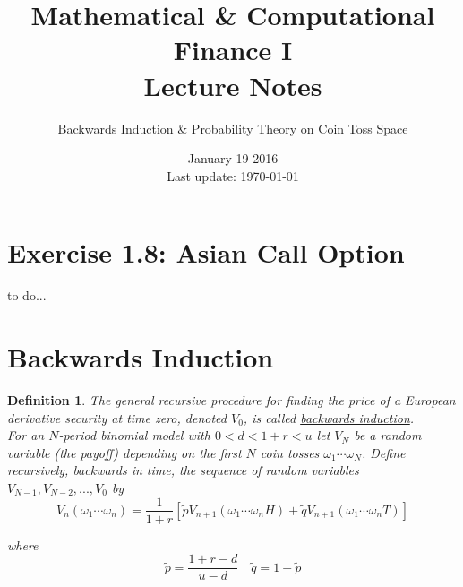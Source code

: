 \documentclass[12pt]{article}
\newtheorem{definition}{Definition}
\newlength\tindent
\renewcommand{\indent}{\hspace*{\tindent}}
\begin{document}
 
 
\title{Mathematical \& Computational Finance I\\Lecture Notes}
\author{Backwards Induction \& Probability Theory on Coin Toss Space}
\date{January 19 2016 \\ Last update: \today{}}
\maketitle

\section{Exercise 1.8: Asian Call Option}

to do...

\section{Backwards Induction}

\begin{definition} The general recursive procedure for finding the price of a European derivative security at time zero, denoted $V_0$, is called \underline{backwards induction}. \\

\indent For an $N$-period binomial model with $0 < d < 1 + r < u$ let $V_N$ be a random variable (the payoff) depending on the first $N$ coin tosses $\omega_1\cdots\omega_N$. Define recursively, backwards in time, the sequence of random variables $V_{N - 1}, V_{N - 2}, ..., V_0$ by
\begin{equation*}
	V_n(\omega_1\cdots\omega_n) = \frac{1}{1 + r}[\tilde{p}V_{n + 1}(\omega_1\cdots\omega_n H) + \tilde{q}V_{n + 1}(\omega_1\cdots\omega_n T)]
\end{equation*}

where
\begin{equation*}
	\tilde{p} = \frac{1 + r - d}{u - d} \quad \tilde{q} = 1 - \tilde{p}
\end{equation*}
\end{definition}
\end{document}
